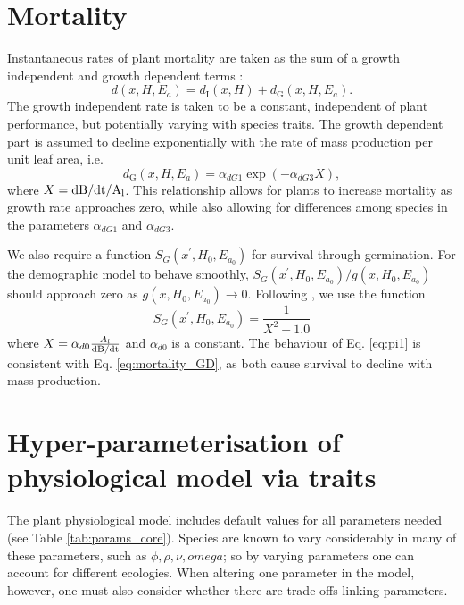 \documentclass[10pt,twoside]{article}
\begin{document}
\section{Mortality}\label{mortality}

Instantaneous rates of plant mortality are taken as the sum of a growth
independent and growth dependent terms
\citep{Falster-2011, Moorcroft-2001}:
\begin{equation}\label{eq:mortality}
d(x, H, E_a) = d_{\textrm{I}}(x, H) + d_{\textrm{G}}(x, H, E_a).
\end{equation}
The growth independent rate is taken to be a constant, independent of
plant performance, but potentially varying with species traits. The
growth dependent part is assumed to decline exponentially with the rate
of mass production per unit leaf area, i.e.
\begin{equation}\label{eq:mortality_GD}
d_{\textrm{G}}(x, H, E_a) = \alpha_{dG1}  \exp(-\alpha_{dG3} X),
\end{equation}
where \(X = \rm{d}B / \rm{d}t / A_\textrm{l}\). This
relationship allows for plants to increase mortality as growth rate
approaches zero, while also allowing for differences among species in
the parameters \(\alpha_{dG1}\) and \(\alpha_{dG3}\).

We also require a function \(S_G(x^\prime, H_0, E_{a_0})\) for survival
through germination. For the demographic model to behave smoothly,
\(S_G (x^\prime, H_0, E_{a_0}) / g(x, H_0, E_{a_0})\) should approach zero as
\(g(x, H_0, E_{a_0}) \rightarrow 0\). Following \citep{Falster-2011},
we use the function
\begin{equation} \label{eq:pi1}
  S_G (x^\prime, H_0, E_{a_0}) = \frac1{X^2 + 1.0}
\end{equation}
where $X = \alpha_{d0} \frac{A_l}{\rm{d}B / \rm{d}t}$ and $\alpha_{d0}$ is a
constant. The behaviour of Eq. \ref{eq:pi1} is consistent with Eq.
\ref{eq:mortality_GD}, as both cause survival to decline with mass production.

\section{Hyper-parameterisation of physiological model via
traits}\label{traits}

The plant physiological model includes default values for all parameters needed
(see Table \ref{tab:params_core}). Species are known to vary considerably
in many of these parameters, such as $\phi,\rho, \nu, omega$; so by varying  parameters
one can account for different ecologies. When altering one parameter in the model, however,
one must also consider whether there are trade-offs linking parameters.
\end{document}
